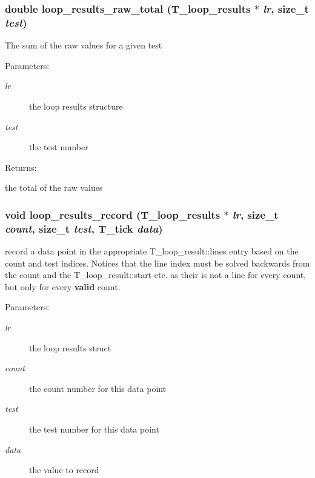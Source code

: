 \subsubsection{\setlength{\rightskip}{0pt plus 5cm}double loop\_\-results\_\-raw\_\-total ({\bf T\_\-loop\_\-results} $\ast$ {\em lr}, size\_\-t {\em test})}\label{group__loop__test_a17}


The sum of the raw values for a given test \begin{Desc}
\item[Parameters: ]\par
\begin{description}
\item[{\em 
lr}]the loop results structure \item[{\em 
test}]the test number \end{description}
\end{Desc}
\begin{Desc}
\item[Returns: ]\par
the total of the raw values \end{Desc}
\subsubsection{\setlength{\rightskip}{0pt plus 5cm}void loop\_\-results\_\-record ({\bf T\_\-loop\_\-results} $\ast$ {\em lr}, size\_\-t {\em count}, size\_\-t {\em test}, {\bf T\_\-tick} {\em data})}\label{group__loop__test_a5}


record a data point in the appropriate T\_\-loop\_\-result::lines entry based on the count and test indices. Notices that the line index must be solved backwards from the count and the T\_\-loop\_\-result::start etc. as their is not a line for every count, but only for every {\bf valid} count.

\begin{Desc}
\item[Parameters: ]\par
\begin{description}
\item[{\em 
lr}]the loop results struct \item[{\em 
count}]the count number for this data point \item[{\em 
test}]the test number for this data point \item[{\em 
data}]the value to record \end{description}
\end{Desc}
